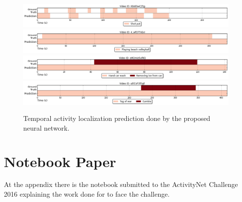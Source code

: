 \begin{figure}[H]
\begin{center}
\includegraphics[width=1\linewidth]{img/results/activity_detection/activity_temporal_localization_20}
\includegraphics[width=1\linewidth]{img/results/activity_detection/activity_temporal_localization_21}
\includegraphics[width=1\linewidth]{img/results/activity_detection/activity_temporal_localization_22}
\includegraphics[width=1\linewidth]{img/results/activity_detection/activity_temporal_localization_23}
\end{center}
\caption{Temporal activity localization prediction done by the proposed neural network.}
\label{fig:results_visualization_detection_annex}
\end{figure}

\chapter{Notebook Paper}

At the appendix there is the notebook submitted to the ActivityNet Challenge 2016 explaining the work done for to face the challenge.

